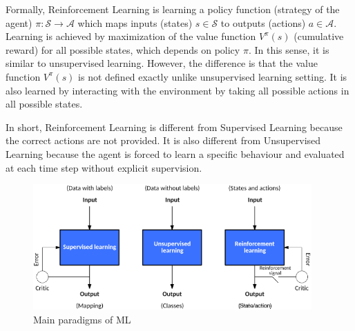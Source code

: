 Formally, Reinforcement Learning is learning a policy function (strategy of the agent)
$\pi \colon \mathcal{S} \rightarrow \mathcal{A}$ which maps 
inputs (states) $s \in \mathcal{S}$ to outputs (actions) $a \in \mathcal{A}$. 
Learning is achieved by maximization of the value function $V^{\pi}(s)$ (cumulative reward) for all possible states, which depends on policy $\pi$. 
In this sense, it is similar to unsupervised learning. 
However, the difference is that the value function $V^{\pi}(s)$ is not defined exactly unlike unsupervised learning setting. 
It is also learned by interacting with the environment by taking all possible actions in all possible states. 

In short, Reinforcement Learning is different from Supervised Learning because the correct actions are not provided. 
It is also different from Unsupervised Learning because the agent is forced to learn a specific behaviour and evaluated at each time step without explicit supervision. 

\begin{figure}
	\centering
	\includegraphics[width=0.95\textwidth]{figures/ml_theory/sl_ul_rl.png}
	\caption{Main paradigms of ML \cite{noauthor_models_nodate}}
	\label{fig:sl_ul_rl}
\end{figure}

